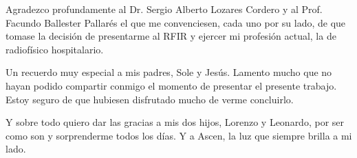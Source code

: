 \begin{flushright}
Agradezco profundamente al Dr. Sergio Alberto Lozares Cordero y al Prof. Facundo Ballester Pallarés el que me convenciesen, cada uno por su lado, de que tomase la decisión de presentarme al RFIR y ejercer mi profesión actual, la de radiofísico hospitalario.

Un recuerdo muy especial a mis padres, Sole y Jesús. Lamento mucho que no hayan podido compartir conmigo el momento de presentar el presente trabajo. Estoy seguro de que hubiesen disfrutado mucho de verme concluirlo.

Y sobre todo quiero dar las gracias a mis dos hijos, Lorenzo y Leonardo, por ser como son y sorprenderme todos los días. Y a Ascen, la luz que siempre brilla a mi lado.

\end{flushright}
\newpage
\thispagestyle{empty}
\begin{flushright}
\end{flushright}
\justify